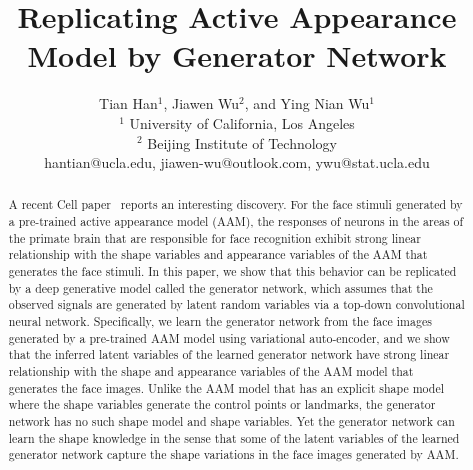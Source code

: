 \documentclass{article}
\title{Replicating Active Appearance Model by Generator Network}
\author{
Tian Han$^1$,
Jiawen Wu$^2$,
and Ying Nian Wu$^1$
\\ 
$^1$ University of California, Los Angeles \\
$^2$ Beijing Institute of Technology \\
%
hantian@ucla.edu,
jiawen-wu@outlook.com, 
ywu@stat.ucla.edu
}
\begin{document}
\maketitle

\begin{abstract}
A recent Cell paper~\cite{chang2017code} reports an interesting discovery. For the face stimuli generated by a pre-trained active appearance model (AAM), the responses of neurons in the areas of the primate brain that are responsible for face recognition exhibit strong linear relationship with the shape variables and appearance variables of the AAM that generates the face stimuli. 
In this paper, we show that this behavior can be replicated by a deep generative model called the generator network, which assumes that the observed signals are generated by  latent random variables  via a top-down convolutional neural network. Specifically, we  learn the generator network from the face images generated by a pre-trained AAM model using variational auto-encoder, and we show that the inferred latent variables of the learned generator network have strong linear relationship with the shape and appearance variables of the AAM model that generates the face images. Unlike the AAM model that has an explicit shape model where the shape variables generate the control points or landmarks, the generator network has no such shape model and shape variables.  Yet the generator network can learn the shape knowledge in the sense that  some of the latent variables of the learned generator network capture the shape variations in the face images generated by AAM. 
\end{abstract}
\end{document}
